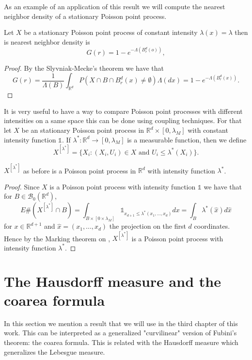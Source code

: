 As an example of an application of this result we will compute the nearest neighbor density of a stationary Poisson point process.

\begin{prop}\label{prop1.0} Let $X$ be a stationary Poisson point process of constant intensity $\lambda(x)=\lambda$ then is nearest neighbor density is $$G(r)=1-e^{-\Lambda( B_{r}^d(o))}, $$ 
\end{prop}

\begin{proof}
By the Slyvniak-Mecke's theorem we have that
$$G(r)=\frac{1}{\Lambda(B)}\int_{\mathbb{R}^d}P(X\cap B\cap B_{r}^d(x)\neq \emptyset)\Lambda(dx)=1-e^{-\Lambda( B_{r}^d(x))}. $$
\end{proof}

It is very useful to have a way to compare Poisson point processes with different intensities on a same space this can be done using coupling techniques. For that let $X$ be an stationary Poisson point process in $\mathbb{R}^{d}\times [0,\lambda_M]$ with constant intensity function $\mathds{1}$. If $\lambda^*:\mathbb{R}^d\rightarrow[0,\lambda_M]$ is a measurable function, then we define $$X^{[\lambda^*]}=\lbrace X_i:(X_i, U_i)\in X\mbox{ and }U_i\leq\lambda^*(X_i)\rbrace.$$ 


\begin{prop}\label{prop1.1}$X^{[\lambda^*]}$ as before is a Poisson point process in $\mathbb{R}^d$ with intensity function $\lambda^*$.
\end{prop}
\begin{proof}
Since $X$ is a Poisson point process with intensity function $\mathds{1}$ we have that for $B\in\mathcal{B}_0(\mathbb{R}^d)$,
$$E\#(X^{[\lambda^*]}\cap B)=\int_{B\times[0\times \lambda_M]}\mathds{1}_{x_{d+1}\leq\lambda^*(x_1, ...,x_d)}dx=\int_B\lambda^*(\hat{x})d\hat{x}$$ for $x\in\mathbb{R}^{d+1}$ and $\hat{x}=(x_1,... ,x_d)$ the projection on the first $d$ coordinates. Hence by the Marking theorem on \cite{Kingman}, $X^{[\lambda^*]}$ is a Poisson point process with intensity function $\lambda^*$.
\end{proof}

\section{The Hausdorff measure and the coarea formula}

In this section we mention a result that we will use in the third chapter of this work. This can be interpreted as a generalized "curvilinear" version of Fubini's theorem: the coarea formula. This is related with the Hausdorff measure which generalizes the Lebesgue measure.

